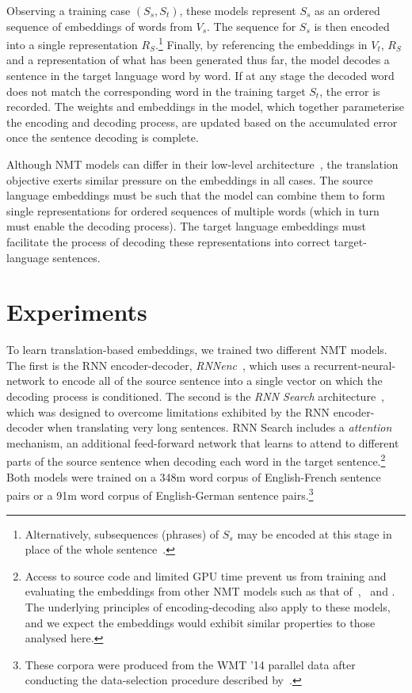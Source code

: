 Observing a training case \((S_s, S_t)\), these models represent \(S_s\) as an ordered sequence of embeddings of words from \(V_s\). The sequence for \(S_s\) is then encoded into a single representation \(R_S\).\footnote{Alternatively, subsequences (phrases) of \(S_s\) may be encoded at this stage in place of the whole sentence~\cite{bahdanau2014neural}.} Finally, by referencing the embeddings in \(V_t\), \(R_S\) and a representation of what has been generated thus far, the model decodes a sentence in the target language word by word. If at any stage the decoded word does not match the corresponding word in the training target \(S_t\), the error is recorded. The weights and embeddings in the model, which together parameterise the encoding and decoding process, are updated based on the accumulated error once the sentence decoding is complete. 

Although NMT models can differ in their low-level architecture~\cite{kalchbrenner13emnlp,Cho2014,bahdanau2014neural}, the translation objective exerts similar pressure on the embeddings in all cases. The source language embeddings must be such that the model can combine them to form single representations for ordered sequences of multiple words (which in turn must enable the decoding process). The target language embeddings must facilitate the process of decoding these representations into correct target-language sentences.    

\section{Experiments}

To learn translation-based embeddings, we trained two different NMT models. The first is the RNN encoder-decoder, \emph{RNNenc}~\cite{Cho2014}, which uses a recurrent-neural-network to encode all of the source sentence into a single vector on which the decoding process is conditioned. The second is the \emph{RNN Search} architecture~\cite{bahdanau2014neural}, which was designed to overcome limitations exhibited by the RNN encoder-decoder when translating very long sentences. RNN Search includes a \emph{attention} mechanism, an additional feed-forward network that learns to attend to different parts of the source sentence when decoding each word in the target sentence.\footnote{Access to source code and limited GPU time prevent us from training and evaluating the embeddings from other NMT models such as that of~\cite{kalchbrenner13emnlp},~\cite{devlin2014fast} and \cite{Sutskever2014sequence}. The underlying principles of encoding-decoding also apply to these models, and we expect the embeddings would exhibit similar properties to those analysed here.} Both models were trained on a 348m word corpus of English-French sentence pairs or a 91m word corpus of English-German sentence pairs.\footnote{These corpora were produced from the WMT ’14 parallel data after conducting the data-selection procedure described by~\cite{Cho2014}. } 

